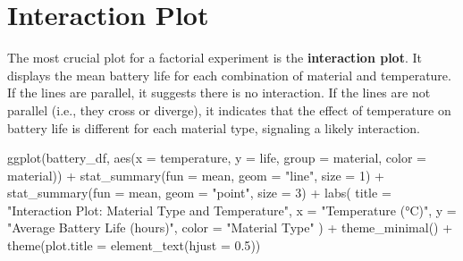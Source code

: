 \documentclass[
  letterpaper,
  DIV=11,
  numbers=noendperiod]{scrreprt}
\newenvironment{Shaded}{\begin{snugshade}}{\end{snugshade}}
\newcommand{\AttributeTok}[1]{\textcolor[rgb]{0.40,0.45,0.13}{#1}}
\newcommand{\DecValTok}[1]{\textcolor[rgb]{0.68,0.00,0.00}{#1}}
\newcommand{\FloatTok}[1]{\textcolor[rgb]{0.68,0.00,0.00}{#1}}
\newcommand{\FunctionTok}[1]{\textcolor[rgb]{0.28,0.35,0.67}{#1}}
\newcommand{\NormalTok}[1]{\textcolor[rgb]{0.00,0.23,0.31}{#1}}
\newcommand{\SpecialCharTok}[1]{\textcolor[rgb]{0.37,0.37,0.37}{#1}}
\newcommand{\StringTok}[1]{\textcolor[rgb]{0.13,0.47,0.30}{#1}}
\begin{document}
\section{Interaction Plot}\label{interaction-plot}

The most crucial plot for a factorial experiment is the
\textbf{interaction plot}. It displays the mean battery life for each
combination of material and temperature. If the lines are parallel, it
suggests there is no interaction. If the lines are not parallel (i.e.,
they cross or diverge), it indicates that the effect of temperature on
battery life is different for each material type, signaling a likely
interaction.

\begin{Shaded}
\begin{Highlighting}[]
\FunctionTok{ggplot}\NormalTok{(battery\_df, }\FunctionTok{aes}\NormalTok{(}\AttributeTok{x =}\NormalTok{ temperature, }\AttributeTok{y =}\NormalTok{ life, }\AttributeTok{group =}\NormalTok{ material, }\AttributeTok{color =}\NormalTok{ material)) }\SpecialCharTok{+}
  \FunctionTok{stat\_summary}\NormalTok{(}\AttributeTok{fun =}\NormalTok{ mean, }\AttributeTok{geom =} \StringTok{"line"}\NormalTok{, }\AttributeTok{size =} \DecValTok{1}\NormalTok{) }\SpecialCharTok{+}
  \FunctionTok{stat\_summary}\NormalTok{(}\AttributeTok{fun =}\NormalTok{ mean, }\AttributeTok{geom =} \StringTok{"point"}\NormalTok{, }\AttributeTok{size =} \DecValTok{3}\NormalTok{) }\SpecialCharTok{+}
  \FunctionTok{labs}\NormalTok{(}
    \AttributeTok{title =} \StringTok{"Interaction Plot: Material Type and Temperature"}\NormalTok{,}
    \AttributeTok{x =} \StringTok{"Temperature (°C)"}\NormalTok{,}
    \AttributeTok{y =} \StringTok{"Average Battery Life (hours)"}\NormalTok{,}
    \AttributeTok{color =} \StringTok{"Material Type"}
\NormalTok{  ) }\SpecialCharTok{+}
  \FunctionTok{theme\_minimal}\NormalTok{() }\SpecialCharTok{+}
  \FunctionTok{theme}\NormalTok{(}\AttributeTok{plot.title =} \FunctionTok{element\_text}\NormalTok{(}\AttributeTok{hjust =} \FloatTok{0.5}\NormalTok{))}
\end{Highlighting}
\end{Shaded}
\end{document}
